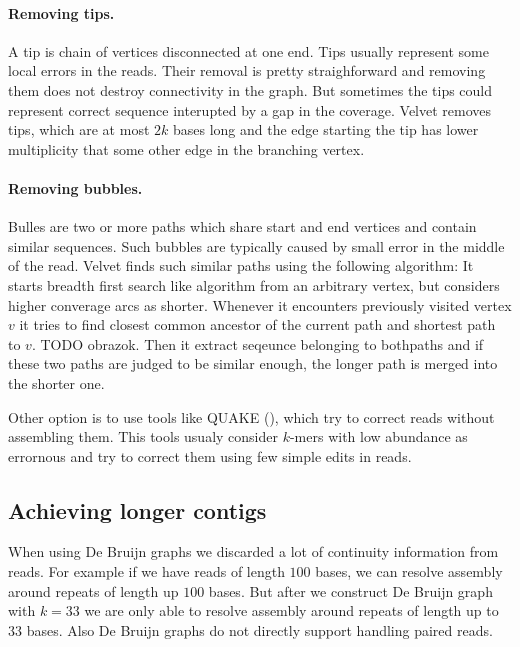 \paragraph{Removing tips.} A tip is chain of vertices disconnected at one end. 
Tips usually represent some local errors in the reads. Their removal is pretty straighforward
and removing them does not destroy connectivity in the graph. But sometimes the tips
could represent correct sequence interupted by a gap in the coverage.
Velvet \citep{Velvet} removes tips, which are at most $2k$ bases long and the edge starting
the tip has lower multiplicity that some other edge in the branching vertex.

\paragraph{Removing bubbles.} Bulles are two or more paths which share start and end vertices
and contain similar sequences.
Such bubbles are typically caused by small error in the middle of the read.
Velvet finds such similar paths using the following algorithm:
It starts breadth first search like algorithm from an arbitrary vertex, but considers higher converage
arcs as shorter. Whenever it encounters previously visited vertex $v$ it tries to find closest common ancestor
of the current path and shortest path to $v$. TODO obrazok. Then it extract seqeunce belonging to bothpaths and
if these two paths are judged to be similar enough, the longer path is merged into the shorter one. 
 
\bigskip

Other option is to use tools like QUAKE (\cite{Quake}), which try to correct reads
without assembling them. This tools usualy consider $k$-mers with low abundance
as errornous and try to correct them using few simple edits in reads.


\subsection{Achieving longer contigs}

When using De Bruijn graphs we discarded a lot of continuity information from reads.
For example if we have reads of length $100$ bases, we can resolve assembly around repeats
of length up $100$ bases. But after we construct De Bruijn graph with $k = 33$ we are only
able to resolve assembly around repeats of length up to $33$ bases. Also De Bruijn graphs
do not directly support handling paired reads.

